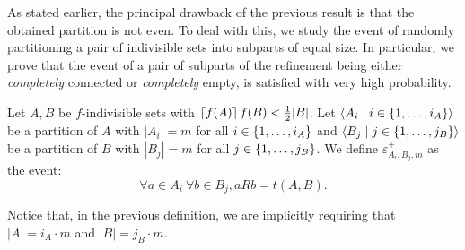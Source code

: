         As stated earlier, the principal drawback of the previous result is that the obtained partition is not even.
        To deal with this, we study the event of randomly partitioning a pair of indivisible sets
        into subparts of equal size.
        In particular, we prove that the event of a pair of subparts of the refinement being either \emph{completely} connected or
        \emph{completely} empty, is satisfied with very high probability.

        \begin{definition}
            Let $A, B$ be $f$-indivisible sets with $\left\lceil f(A) \right\rceil f(B) < \frac{1}{2} |B|$.
            Let $\left< A_i \mid i \in \{ 1, \dots, i_A \} \right>$ be a partition of $A$ with $|A_i| = m$ for all
            $i \in \{ 1, \dots, i_A \}$ and $\left< B_j \mid j \in \{ 1, \dots, j_B \} \right>$ be a partition of
            $B$ with $|B_j| = m$ for all $j \in \{ 1, \dots, j_B \}$.
            We define $\varepsilon^+_{A_i,B_j,m}$ as the event:
            \[
                \forall a \in A_i \ \forall b \in B_j, a R b = t(A,B).
            \]
        \end{definition}

        Notice that, in the previous definition, we are implicitly requiring that $|A| = i_A \cdot m$ and $|B| = j_B \cdot m$.

